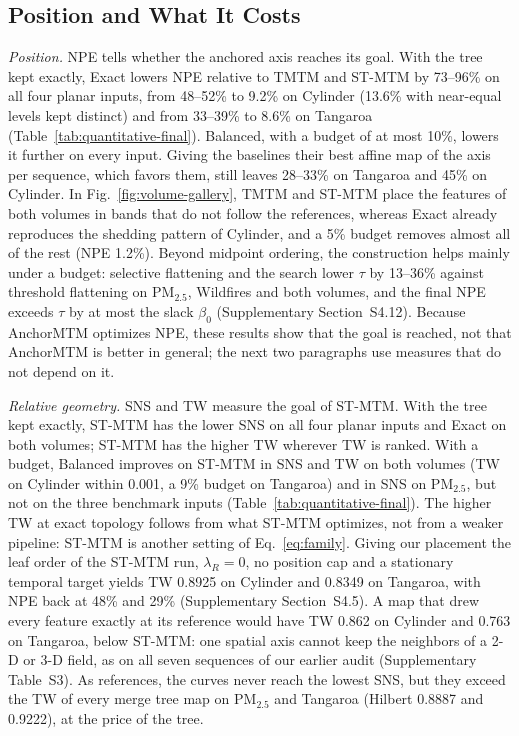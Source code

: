 \subsection{Position and What It Costs}\label{sec:reference-results}
\emph{Position.} NPE tells whether the anchored axis reaches its goal. With the tree kept exactly, Exact lowers NPE relative to TMTM and ST-MTM by 73--96\% on all four planar inputs, from 48--52\% to 9.2\% on Cylinder (13.6\% with near-equal levels kept distinct) and from 33--39\% to 8.6\% on Tangaroa (Table~\ref{tab:quantitative-final}). Balanced, with a budget of at most 10\%, lowers it further on every input. Giving the baselines their best affine map of the axis per sequence, which favors them, still leaves 28--33\% on Tangaroa and 45\% on Cylinder. In Fig.~\ref{fig:volume-gallery}, TMTM and ST-MTM place the features of both volumes in bands that do not follow the references, whereas Exact already reproduces the shedding pattern of Cylinder, and a 5\% budget removes almost all of the rest (NPE 1.2\%). Beyond midpoint ordering, the construction helps mainly under a budget: selective flattening and the search lower $\tau$ by 13--36\% against threshold flattening on PM$_{2.5}$, Wildfires and both volumes, and the final NPE exceeds $\tau$ by at most the slack $\beta_0$ (Supplementary Section~S4.12). Because AnchorMTM optimizes NPE, these results show that the goal is reached, not that AnchorMTM is better in general; the next two paragraphs use measures that do not depend on it.

\emph{Relative geometry.} SNS and TW measure the goal of ST-MTM. With the tree kept exactly, ST-MTM has the lower SNS on all four planar inputs and Exact on both volumes; ST-MTM has the higher TW wherever TW is ranked. With a budget, Balanced improves on ST-MTM in SNS and TW on both volumes (TW on Cylinder within 0.001, a 9\% budget on Tangaroa) and in SNS on PM$_{2.5}$, but not on the three benchmark inputs (Table~\ref{tab:quantitative-final}). The higher TW at exact topology follows from what ST-MTM optimizes, not from a weaker pipeline: ST-MTM is another setting of Eq.~\ref{eq:family}. Giving our placement the leaf order of the ST-MTM run, $\lambda_R=0$, no position cap and a stationary temporal target yields TW 0.8925 on Cylinder and 0.8349 on Tangaroa, with NPE back at 48\% and 29\% (Supplementary Section~S4.5). A map that drew every feature exactly at its reference would have TW 0.862 on Cylinder and 0.763 on Tangaroa, below ST-MTM: one spatial axis cannot keep the neighbors of a 2-D or 3-D field, as on all seven sequences of our earlier audit (Supplementary Table~S3). As references, the curves never reach the lowest SNS, but they exceed the TW of every merge tree map on PM$_{2.5}$ and Tangaroa (Hilbert 0.8887 and 0.9222), at the price of the tree.

